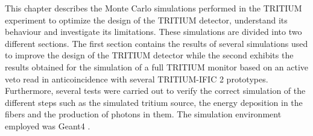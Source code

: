 This chapter describes the Monte Carlo simulations performed in the TRITIUM experiment to optimize the design of the TRITIUM detector, understand its behaviour and investigate its limitations. These simulations are divided into two different sections. The first section contains the results of several simulations used to improve the design of the TRITIUM detector while the second exhibits the results obtained for the simulation of a full TRITIUM monitor based on an active veto read in anticoincidence with several TRITIUM-IFIC 2 prototypes. Furthermore, several tests were carried out to verify the correct simulation of the different steps such as the simulated tritium source, the energy deposition in the fibers and the production of photons in them. The simulation environment employed was Geant4 \cite{Geant4WebPage, Geant4P}.